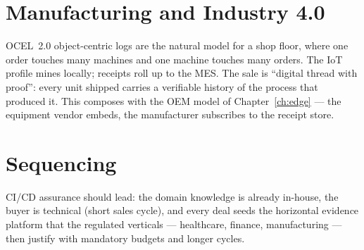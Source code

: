 \section{Manufacturing and Industry 4.0}

OCEL~2.0 object-centric logs are the natural model for a shop floor, where
one order touches many machines and one machine touches many orders. The
IoT profile mines locally; receipts roll up to the MES. The sale is
``digital thread with proof'': every unit shipped carries a verifiable
history of the process that produced it. This composes with the OEM model
of Chapter~\ref{ch:edge} --- the equipment vendor embeds, the manufacturer
subscribes to the receipt store.

\section{Sequencing}

CI/CD assurance should lead: the domain knowledge is already in-house, the
buyer is technical (short sales cycle), and every deal seeds the
horizontal evidence platform that the regulated verticals --- healthcare,
finance, manufacturing --- then justify with mandatory budgets and longer
cycles.

